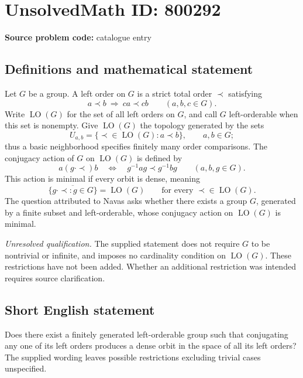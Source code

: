 \documentclass[11pt]{article}
\begin{document}
\section*{UnsolvedMath ID: 800292}
\textbf{Source problem code:} catalogue entry
\subsection{Definitions and mathematical statement}
Let \(G\) be a group. A left order on \(G\) is a strict total order \(\prec\) satisfying
\[
 a\prec b\ \Longrightarrow\ ca\prec cb
 \qquad(a,b,c\in G).
\]
Write \(\operatorname{LO}(G)\) for the set of all left orders on \(G\), and call \(G\) left-orderable when this set is nonempty. Give \(\operatorname{LO}(G)\) the topology generated by the sets
\[
 U_{a,b}=\{\prec\in\operatorname{LO}(G):a\prec b\},
 \qquad a,b\in G;
\]
thus a basic neighborhood specifies finitely many order comparisons. The conjugacy action of \(G\) on \(\operatorname{LO}(G)\) is defined by
\[
 a\mathrel{(g\cdot\prec)}b
 \quad\Longleftrightarrow\quad
 g^{-1}ag\prec g^{-1}bg
 \qquad(a,b,g\in G).
\]
This action is minimal if every orbit is dense, meaning
\[
 \overline{\{g\cdot\prec:g\in G\}}=\operatorname{LO}(G)
 \qquad\text{for every }\prec\in\operatorname{LO}(G).
\]
The question attributed to Navas asks whether there exists a group \(G\), generated by a finite subset and left-orderable, whose conjugacy action on \(\operatorname{LO}(G)\) is minimal.

\emph{Unresolved qualification.} The supplied statement does not require \(G\) to be nontrivial or infinite, and imposes no cardinality condition on \(\operatorname{LO}(G)\). These restrictions have not been added. Whether an additional restriction was intended requires source clarification.
\subsection{Short English statement}
Does there exist a finitely generated left-orderable group such that conjugating any one of its left orders produces a dense orbit in the space of all its left orders? The supplied wording leaves possible restrictions excluding trivial cases unspecified.
\end{document}
